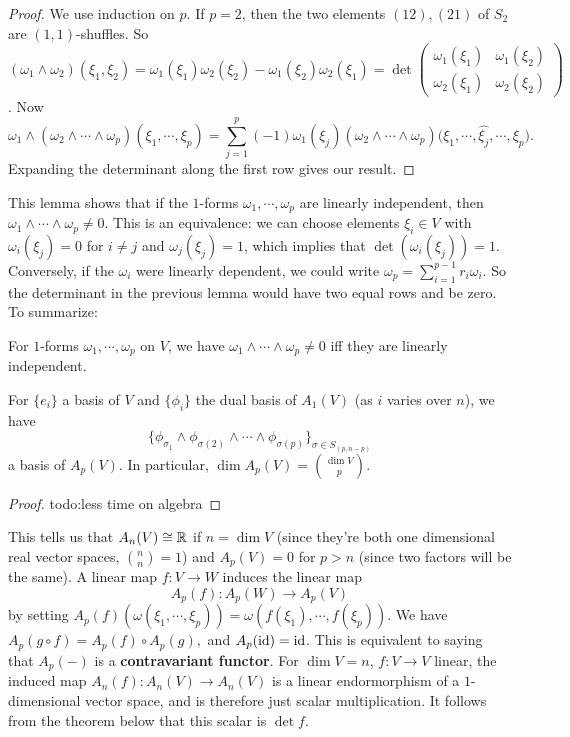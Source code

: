 \begin{proof}
    We use induction on $p$. If $p=2$, then the two elements $(12),(21)$ of $S_2$ are $(1,1)$-shuffles. So $(\omega_1\wedge\omega_2)(\xi_1,\xi_2)=\omega_1(\xi_1)\omega_2(\xi_2)-\omega_1(\xi_2)\omega_2(\xi_1)=\det \left( 
    \begin{smallmatrix}
        \omega_1(\xi_1) & \omega_1(\xi_2)\\
        \omega_2(\xi_1) & \omega_2(\xi_2)
    \end{smallmatrix}\right) $. Now \[
    \omega_1\wedge (\omega_2\wedge \cdots \wedge \omega_p)(\xi_1,\cdots ,\xi_p)=\sum_{j=1}^{p} (-1)\omega_1(\xi_j )(\omega_2\wedge \cdots \wedge \omega_p)\big(\xi_1,\cdots ,\hat{\xi_j },\cdots ,\xi_p\big).
    \] Expanding the determinant along the first row gives our result.
\end{proof}
This lemma shows that if the $1$-forms $\omega_1,\cdots ,\omega_p $ are linearly independent, then $\omega_1\wedge\cdots \wedge\omega_p\neq 0$. This is an equivalence: we can choose elements $\xi_i \in V$ with $\omega_i (\xi_j )=0$ for $i\neq j$ and $\omega_j (\xi_j )=1$, which implies that $\det (\omega_i (\xi_j ))=1$. Conversely, if the $\omega_i $ were linearly dependent, we could write $\omega_p=\sum _{i=1}^{p-1}r_i \omega_i $. So the determinant in the previous lemma would have two equal rows and be zero. To summarize:
\begin{lemma}
    For $1$-forms $\omega_1,\cdots ,\omega_p$ on $V$, we have $\omega_1\wedge \cdots \wedge \omega_p \neq 0$ iff they are linearly independent.
\end{lemma}
\begin{theorem}\label{basis} 
    For $\{e_i \} $ a basis of $V$ and $\{\phi_i \} $ the dual basis of $A_1(V)$ (as $i$ varies over $n$), we have \[
        \{\phi_{\sigma_1 }\wedge \phi_{\sigma(2)}\wedge \cdots \wedge \phi_{\sigma(p)}\} _{\sigma \in S_{(p,n-p)}}
    \] a basis of $A_p(V)$. In particular, $\dim A_p(V)={\dim V\choose p}  $. 
\end{theorem}
\begin{proof}
    {\color{red}todo:less time on algebra} 
\end{proof}
This tells us that $A_n (V)\cong \mathbb{R}$ if $n=\dim V$ (since they're both one dimensional real vector spaces, ${n\choose n} =1$) and $A_p(V)=0$ for $p>n$ (since two factors will be the same). A linear map $f \colon V \to W$ induces the linear map  \[
    A_p(f) \colon A_p(W) \to A_p(V)
\] by setting $A_p(f)(\omega(\xi_1,\cdots ,\xi_p))=\omega(f(\xi_1),\cdots ,f(\xi_p)).$ We have $A_p(g \circ f)=A_p(f) \circ A_p(g),$ and $A_p(\operatorname{id})=\operatorname{id}$. This is equivalent to saying that $A_p(-)$ is a \textbf{contravariant functor}. For $\dim V=n$, $f \colon V \to V$ linear, the induced map $A_n (f) \colon A_n (V) \to A_n (V)$ is a linear endormorphism of a $1$-dimensional vector space, and is therefore just scalar multiplication. It follows from the theorem below that this scalar is $\det f$.

